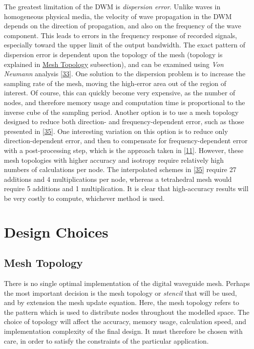 \documentclass[]{scrreprt}
\begin{document}
The greatest limitation of the DWM is \emph{dispersion error}. Unlike
waves in homogeneous physical media, the velocity of wave propagation in
the DWM depends on the direction of propagation, and also on the
frequency of the wave component. This leads to errors in the frequency
response of recorded signals, especially toward the upper limit of the
output bandwidth. The exact pattern of dispersion error is dependent
upon the topology of the mesh (topology is explained in
\protect\hyperlink{mesh-topology}{Mesh Topology} subsection), and can be
examined using \emph{Von Neumann} analysis
{[}\protect\hyperlink{ref-vanux5fduyneux5f3dux5f1996}{33}{]}. One
solution to the dispersion problem is to increase the sampling rate of
the mesh, moving the high-error area out of the region of interest. Of
course, this can quickly become very expensive, as the number of nodes,
and therefore memory usage and computation time is proportional to the
inverse cube of the sampling period. Another option is to use a mesh
topology designed to reduce both direction- and frequency-dependent
error, such as those presented in
{[}\protect\hyperlink{ref-kowalczykux5froomux5f2011}{35}{]}. One
interesting variation on this option is to reduce only
direction-dependent error, and then to compensate for
frequency-dependent error with a post-processing step, which is the
approach taken in
{[}\protect\hyperlink{ref-saviojaux5finterpolatedux5f2001}{11}{]}.
However, these mesh topologies with higher accuracy and isotropy require
relatively high numbers of calculations per node. The interpolated
schemes in {[}\protect\hyperlink{ref-kowalczykux5froomux5f2011}{35}{]}
require 27 additions and 4 multiplications per node, whereas a
tetrahedral mesh would require 5 additions and 1 multiplication. It is
clear that high-accuracy results will be very costly to compute,
whichever method is used.

\section{Design Choices}\label{design-choices}

\hypertarget{mesh-topology}{\subsection{Mesh
Topology}\label{mesh-topology}}

There is no single optimal implementation of the digital waveguide mesh.
Perhaps the most important decision is the mesh topology or
\emph{stencil} that will be used, and by extension the mesh update
equation. Here, the mesh topology refers to the pattern which is used to
distribute nodes throughout the modelled space. The choice of topology
will affect the accuracy, memory usage, calculation speed, and
implementation complexity of the final design. It must therefore be
chosen with care, in order to satisfy the constraints of the particular
application.
\end{document}
